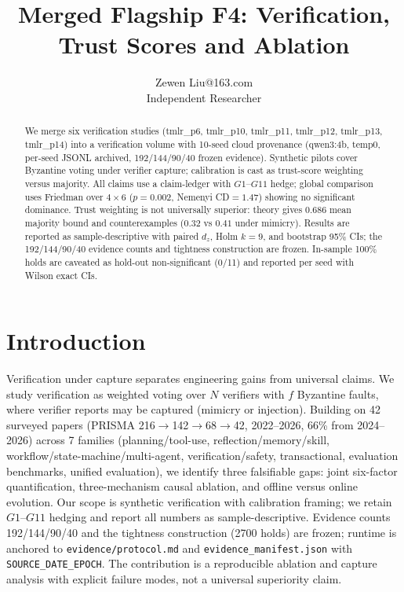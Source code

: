 \documentclass[10pt]{article}
\title{Merged Flagship F4: Verification, Trust Scores and Ablation}
\author{\name Zewen Liu\email 17353895263@163.com\\\addr Independent Researcher}
\begin{document}
\maketitle
\begin{abstract}
We merge six verification studies (tmlr\_p6, tmlr\_p10, tmlr\_p11, tmlr\_p12, tmlr\_p13, tmlr\_p14) into a verification volume with 10-seed cloud provenance (qwen3:4b, temp0, per-seed JSONL archived, 192/144/90/40 frozen evidence). Synthetic pilots cover Byzantine voting under verifier capture; calibration is cast as trust-score weighting versus majority. All claims use a claim-ledger with $G1$--$G11$ hedge; global comparison uses Friedman over $4\times 6$ ($p{=}0.002$, Nemenyi CD$=1.47$) showing no significant dominance. Trust weighting is not universally superior: theory gives $0.686$ mean majority bound and counterexamples ($0.32$ vs $0.41$ under mimicry). Results are reported as sample-descriptive with paired $d_z$, Holm $k{=}9$, and bootstrap 95\% CIs; the 192/144/90/40 evidence counts and tightness construction are frozen. In-sample 100\% holds are caveated as hold-out non-significant (0/11) and reported per seed with Wilson exact CIs.
\end{abstract}
\tableofcontents
\newpage

\section{Introduction}
Verification under capture separates engineering gains from universal claims. We study verification as weighted voting over $N$ verifiers with $f$ Byzantine faults, where verifier reports may be captured (mimicry or injection). Building on 42 surveyed papers (PRISMA 216$\to$142$\to$68$\to$42, 2022--2026, 66\% from 2024--2026) across 7 families (planning/tool-use, reflection/memory/skill, workflow/state-machine/multi-agent, verification/safety, transactional, evaluation benchmarks, unified evaluation), we identify three falsifiable gaps: joint six-factor quantification, three-mechanism causal ablation, and offline versus online evolution. Our scope is synthetic verification with calibration framing; we retain $G1$--$G11$ hedging and report all numbers as sample-descriptive. Evidence counts 192/144/90/40 and the tightness construction (2700 holds) are frozen; runtime is anchored to {\tt evidence/protocol.md} and {\tt evidence\_manifest.json} with {\tt SOURCE\_DATE\_EPOCH}. The contribution is a reproducible ablation and capture analysis with explicit failure modes, not a universal superiority claim.
\end{document}

